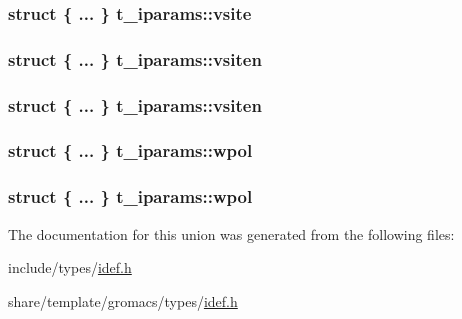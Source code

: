 \hypertarget{uniont__iparams_a66b5a89edd9145dd32d4da84c4b56c3e}{
\subsubsection[{vsite}]{\setlength{\rightskip}{0pt plus 5cm}struct \{ ... \}   {\bf t\-\_\-iparams\-::vsite}}}\label{uniont__iparams_a66b5a89edd9145dd32d4da84c4b56c3e}
\hypertarget{uniont__iparams_a79f10746ca05449c52281f56a37652c7}{
\subsubsection[{vsiten}]{\setlength{\rightskip}{0pt plus 5cm}struct \{ ... \}   {\bf t\-\_\-iparams\-::vsiten}}}\label{uniont__iparams_a79f10746ca05449c52281f56a37652c7}
\hypertarget{uniont__iparams_a34efe9b205e5af60734b5735ff562f9d}{
\subsubsection[{vsiten}]{\setlength{\rightskip}{0pt plus 5cm}struct \{ ... \}   {\bf t\-\_\-iparams\-::vsiten}}}\label{uniont__iparams_a34efe9b205e5af60734b5735ff562f9d}
\hypertarget{uniont__iparams_ada233546717982f06db151ef23af7666}{
\subsubsection[{wpol}]{\setlength{\rightskip}{0pt plus 5cm}struct \{ ... \}   {\bf t\-\_\-iparams\-::wpol}}}\label{uniont__iparams_ada233546717982f06db151ef23af7666}
\hypertarget{uniont__iparams_ac61d33a4e26149e38e39a0677142e850}{
\subsubsection[{wpol}]{\setlength{\rightskip}{0pt plus 5cm}struct \{ ... \}   {\bf t\-\_\-iparams\-::wpol}}}\label{uniont__iparams_ac61d33a4e26149e38e39a0677142e850}


\-The documentation for this union was generated from the following files\-:\begin{DoxyCompactItemize}
\item 
include/types/\hyperlink{include_2types_2idef_8h}{idef.\-h}\item 
share/template/gromacs/types/\hyperlink{share_2template_2gromacs_2types_2idef_8h}{idef.\-h}\end{DoxyCompactItemize}
